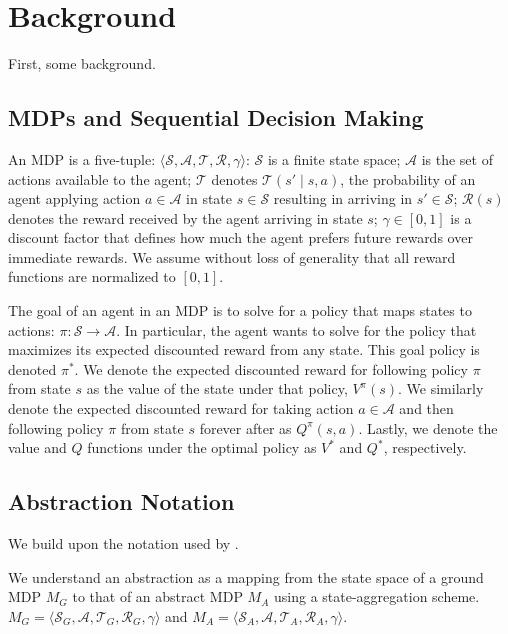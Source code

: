 \section{Background}

First, some background.

\subsection{\acp{MDP} and Sequential Decision Making}
An \ac{MDP} is a five-tuple: $\langle \mathcal{S}, \mathcal{A}, \mathcal{T}, \mathcal{R}, \gamma \rangle$: $\mathcal{S}$ is a finite state space; $\mathcal{A}$ is the set of actions available to the agent; $\mathcal{T}$ denotes $\mathcal{T}(s' \mid s,a)$, the probability of an agent applying action $a \in \mathcal{A}$ in state $s \in \mathcal{S}$ resulting in arriving in $s' \in \mathcal{S}$; $\mathcal{R}(s)$ denotes the reward received by the agent arriving in state $s$; $\gamma \in [0, 1]$ is a discount  factor that defines how much the agent prefers future rewards over immediate rewards. We assume without loss of generality that all reward functions are normalized to $[0,1]$.

The goal of an agent in an \ac{MDP} is to solve for a policy that maps states to actions: $\pi: \mathcal{S} \rightarrow \mathcal{A}$. In particular, the agent wants to solve for the policy that maximizes its expected discounted reward from any state. This goal policy is denoted $\pi^*$. We denote the expected discounted reward for following policy $\pi$ from state $s$ as the value of the state under that policy, $V^\pi(s)$. We similarly denote the expected discounted reward for taking action $a \in \mathcal{A}$ and then following policy $\pi$ from state $s$ forever after as $Q^\pi(s,a)$. Lastly, we denote the value and $Q$ functions under the optimal policy as $V^*$ and $Q^*$, respectively. 


\subsection{Abstraction Notation}
We build upon the notation used by \citeauthor{li2006towards} .

We understand an abstraction as a mapping from the state space of a ground MDP $M_G$ to that of an abstract MDP $M_A$ using a state-aggregation scheme. $M_G = \langle \mathcal{S}_G, \mathcal{A}, \mathcal{T}_G, \mathcal{R}_G, \gamma \rangle$ and $M_A = \langle \mathcal{S}_A, \mathcal{A}, \mathcal{T}_A, \mathcal{R}_A, \gamma \rangle$.


